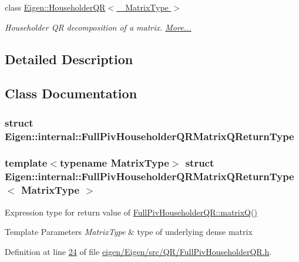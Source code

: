 \begin{DoxyCompactItemize}
class \hyperlink{group___q_r___module_class_eigen_1_1_householder_q_r}{Eigen\+::\+Householder\+Q\+R$<$ \+\_\+\+Matrix\+Type $>$}
\begin{DoxyCompactList}\small\item\em Householder QR decomposition of a matrix.  \hyperlink{group___q_r___module_class_eigen_1_1_householder_q_r}{More...}\end{DoxyCompactList}\end{DoxyCompactItemize}


\subsection{Detailed Description}


\subsection{Class Documentation}
\label{struct_eigen_1_1internal_1_1_full_piv_householder_q_r_matrix_q_return_type}
\subsubsection{struct Eigen\+:\+:internal\+:\+:Full\+Piv\+Householder\+Q\+R\+Matrix\+Q\+Return\+Type}
\subsubsection*{template$<$typename Matrix\+Type$>$\newline
struct Eigen\+::internal\+::\+Full\+Piv\+Householder\+Q\+R\+Matrix\+Q\+Return\+Type$<$ Matrix\+Type $>$}

Expression type for return value of \hyperlink{group___q_r___module_ad26dd2d3c002939771d2375e4e051c28}{Full\+Piv\+Householder\+Q\+R\+::matrix\+Q()} 


\begin{DoxyTemplParams}{Template Parameters}
{\em Matrix\+Type} & type of underlying dense matrix \\
\hline
\end{DoxyTemplParams}


Definition at line \hyperlink{eigen_2_eigen_2src_2_q_r_2_full_piv_householder_q_r_8h_source_l00024}{24} of file \hyperlink{eigen_2_eigen_2src_2_q_r_2_full_piv_householder_q_r_8h_source}{eigen/\+Eigen/src/\+Q\+R/\+Full\+Piv\+Householder\+Q\+R.\+h}.


